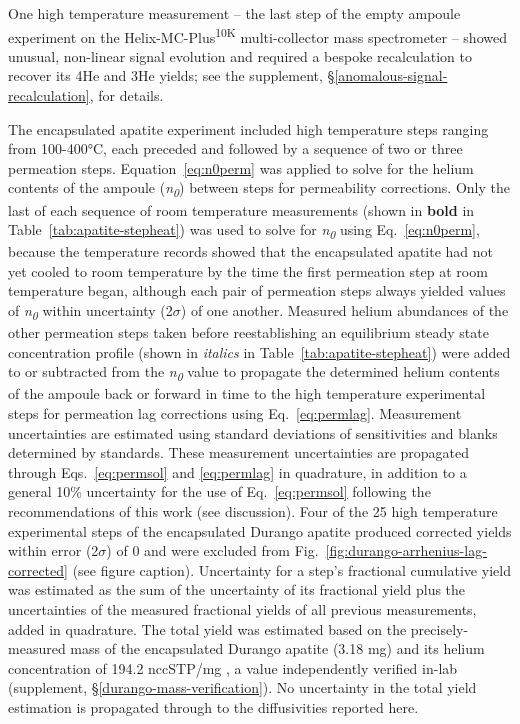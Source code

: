 One high temperature measurement -- the last step of the empty ampoule experiment on the Helix-MC-Plus\textsuperscript{10K} multi-collector mass spectrometer -- showed unusual, non-linear signal evolution and required a bespoke recalculation to recover its 4He and 3He yields; see the supplement, \S\ref{anomalous-signal-recalculation}, for details.

The encapsulated apatite experiment included high temperature steps ranging from 100-400°C, each preceded and followed by a sequence of two or three permeation steps. Equation~\eqref{eq:n0perm} was applied to solve for the helium contents of the ampoule (\emph{n\textsubscript{0}}) between steps for permeability corrections. Only the last of each sequence of room temperature measurements (shown in \textbf{bold} in Table~\ref{tab:apatite-stepheat}) was used to solve for \emph{n\textsubscript{0}} using Eq.~\eqref{eq:n0perm}, because the temperature records showed that the encapsulated apatite had not yet cooled to room temperature by the time the first permeation step at room temperature began, although each pair of permeation steps always yielded values of \emph{n\textsubscript{0}} within uncertainty (2$\sigma$) of one another. Measured helium abundances of the other permeation steps taken before reestablishing an equilibrium steady state concentration profile (shown in \emph{italics} in Table~\ref{tab:apatite-stepheat}) were added to or subtracted from the \emph{n\textsubscript{0}} value to propagate the determined helium contents of the ampoule back or forward in time to the high temperature experimental steps for permeation lag corrections using Eq.~\eqref{eq:permlag}. Measurement uncertainties are estimated using standard deviations of sensitivities and blanks determined by standards. These measurement uncertainties are propagated through Eqs.~\eqref{eq:permsol} and \eqref{eq:permlag} in quadrature, in addition to a general 10\% uncertainty for the use of Eq.~\eqref{eq:permsol} following the recommendations of this work (see discussion). Four of the 25 high temperature experimental steps of the encapsulated Durango apatite produced corrected yields within error (2$\sigma$) of 0 and were excluded from Fig.~\ref{fig:durango-arrhenius-lag-corrected} (see figure caption). Uncertainty for a step's fractional cumulative yield was estimated as the sum of the uncertainty of its fractional yield plus the uncertainties of the measured fractional yields of all previous measurements, added in quadrature. The total yield was estimated based on the precisely-measured mass of the encapsulated Durango apatite (3.18 mg) and its helium concentration of 194.2 nccSTP/mg \citep{farley2000}, a value independently verified in-lab (supplement, \S\ref{durango-mass-verification}). No uncertainty in the total yield estimation is propagated through to the diffusivities reported here.

